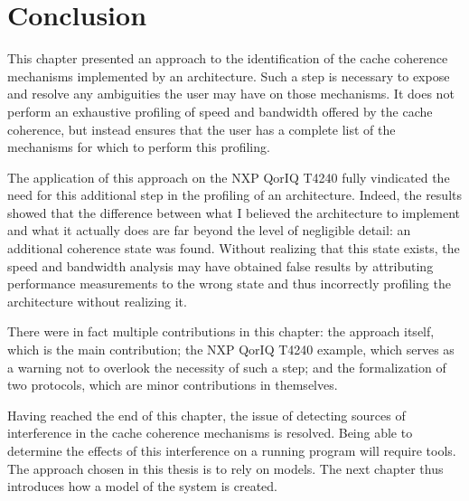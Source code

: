 \section{Conclusion}
This chapter presented an approach to the identification of the cache coherence
mechanisms implemented by an architecture. Such a step is necessary to expose
and resolve any ambiguities the user may have on those mechanisms. It does not
perform an exhaustive profiling of speed and bandwidth offered by the cache
coherence, but instead ensures that the user has a complete list of the
mechanisms for which to perform this profiling.

The application of this approach on the NXP QorIQ T4240 fully vindicated the
need for this additional step in the profiling of an architecture. Indeed, the
results showed that the difference between what I believed the architecture to
implement and what it actually does are far beyond the level of negligible
detail: an additional coherence state was found. Without realizing that this
state exists, the speed and bandwidth analysis may have obtained false results
by attributing performance measurements to the wrong state and thus incorrectly
profiling the architecture without realizing it.

There were in fact multiple contributions in this chapter: the approach itself,
which is the main contribution; the NXP QorIQ T4240 example, which serves as a
warning not to overlook the necessity of such a step; and the formalization of
two protocols, which are minor contributions in themselves.

Having reached the end of this chapter, the issue of detecting sources of
interference in the cache coherence mechanisms is resolved. Being able to
determine the effects of this interference on a running program will require
tools. The approach chosen in this thesis is to rely on models. The next chapter
thus introduces how a model of the system is created.
